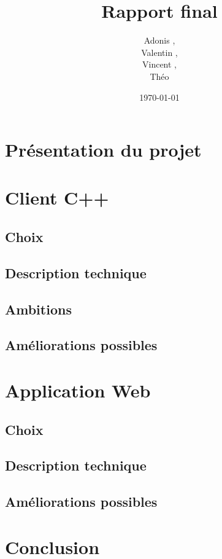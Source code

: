 \documentclass[a4paper]{article}
\title{Rapport final}
\author{Adonis \bsc{Najimi},\\
 Valentin \bsc{Stern},\\
 Vincent \bsc{Albert},\\
 Théo \bsc{Gerriet}}
\date{\today}
\begin{document}
\maketitle
\newpage

\section{Présentation du projet}


\section{Client C++}
		\subsection{Choix}
    
		
    \subsection{Description technique}
    

    \subsection{Ambitions}
    
    
    \subsection{Améliorations possibles}
    

\newpage
\section{Application Web}
	\subsection{Choix}
		
	
	\subsection{Description technique}
		
	
	\subsection{Améliorations possibles}
		
	
\newpage
\section{Conclusion}
	

\newpage
\tableofcontents
\end{document}

